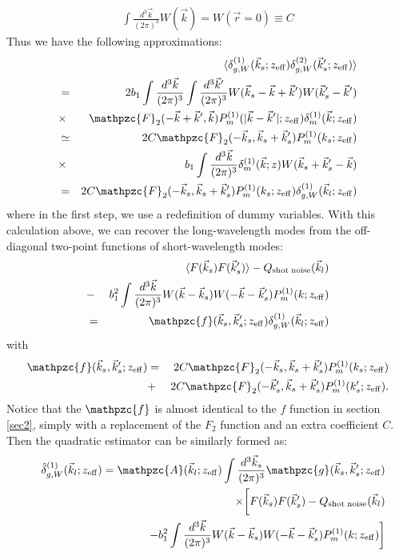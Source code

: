 \documentclass[prd,amsmath,amssymb,floatfix,superscriptaddress,nofootinbib,twocolumn]{revtex4-1}
\newcommand{\vrr}{\vec{r}}
\newcommand{\vs}{\nonumber\\}
\newcommand{\vk}{\vec{k}}
\newcommand{\eql}[1]{\label{eq:#1}}
\begin{document}
\begin{eqnarray}
\int\frac{d^{3}\vec{k}}{(2\pi)^3}W(\vec{k})= W(\vrr=0)\equiv C \eql{defC}
\end{eqnarray}
Thus we have the following approximations:
\begin{eqnarray}
&&\langle \delta^{(1)}_{g,W}(\vec{k}_s;z_{\rm eff})\delta^{(2)}_{g,W}(\vec{k}'_s;z_{\rm eff})\rangle\nonumber\\
&=&2b_{1}\int \frac{d^{3}\vec{k}}{(2\pi)^3}\int \frac{d^{3}\vec{k}'}{(2\pi)^3}W(\vec{k}_s-\vec{k}+\vec{k}')W(\vec{k}'_s-\vec{k}')\nonumber\\
&\times &\mathpzc{F}_{2}(-\vec{k}+\vec{k}',\vec{k})P_{m}^{(1)}(|\vec{k}-\vec{k}'|;z_{\rm eff})\delta_{m}^{(1)}(\vec{k};z_{\rm eff})\nonumber\\
&\simeq&2C\mathpzc{F}_2(-\vec{k}_s,\vec{k}_s+\vec{k}'_s)P_{m}^{(1)}(k_s;z_{\rm eff})\nonumber\\
&\times & b_{1}\int \frac{d^{3}\vec{k}}{(2\pi)^3}\delta_{m}^{(1)}(\vec{k};z)W(\vec{k}_s+\vec{k}'_s-\vec{k})\nonumber\\
&=& 2C\mathpzc{F}_2(-\vec{k}_s,\vec{k}_s+\vec{k}'_s)P_{m}^{(1)}(k_s;z_{\rm eff})\delta^{(1)}_{g,W}(\vec{k}_l;z_{\rm eff}) \eql{extW}
\end{eqnarray}
where in the first step, we use a redefinition of dummy variables. With this calculation above, we can recover the long-wavelength modes from the off-diagonal two-point functions of short-wavelength modes:
\begin{eqnarray}
&&\langle F(\vec{k}_s)F(\vec{k}'_s)\rangle-Q_{\rm shot \; noise}(\vk_l)\nonumber\\
&-&b_1^2\int \frac{d^{3}\vec{k}}{(2\pi)^3} W(\vec{k}-\vec{k}_s)W(-\vec{k}-\vec{k}'_s)P^{(1)}_{m}(k;z_{\rm eff})\nonumber\\
&=&\mathpzc{f}(\vec{k}_s,\vec{k}'_s;z_{\rm eff})\delta^{(1)}_{g,W}(\vec{k}_l;z_{\rm eff})
\end{eqnarray}
with
\begin{eqnarray}
\mathpzc{f}(\vec{k}_s,\vec{k}'_s;z_{\rm eff})&=&2C\mathpzc{F}_2(-\vec{k}_s,\vec{k}_s+\vec{k}'_s)P_{m}^{(1)}(k_s;z_{\rm eff})\nonumber \\
&+&2C\mathpzc{F}_2(-\vec{k}'_s,\vec{k}_s+\vec{k}'_s)P_{m}^{(1)}(k'_s;z_{\rm eff}).
\end{eqnarray}
Notice that the $\mathpzc{f}$ is almost identical to the $f$ function in section \ref{sec2}, simply with a replacement of the $F_2$ function and an extra coefficient $C$. Then the quadratic estimator can be similarly formed as:
\begin{eqnarray}
&&\hat{\delta}^{(1)}_{g,W}(\vec{k}_l;z_{\rm eff})=\mathpzc{A}(\vec{k}_l;z_{\rm eff})\int \frac{d^{3}\vec{k}_s}{(2\pi)^3}\mathpzc{g}(\vec{k}_s,\vec{k}'_s;z_{\rm eff})\nonumber \\
&& \times \bigg[F(\vec{k}_s)F(\vec{k}'_s)-Q_{\rm shot \; noise}(\vk_l) \vs
&&- b_1^2\int \frac{d^{3}\vec{k}}{(2\pi)^3} W(\vec{k}-\vec{k}_s)W(-\vec{k}-\vec{k}'_s)P^{(1)}_{m}(k;z_{\rm eff})\bigg] \eql{qeLC}
\end{eqnarray}
\end{document}
